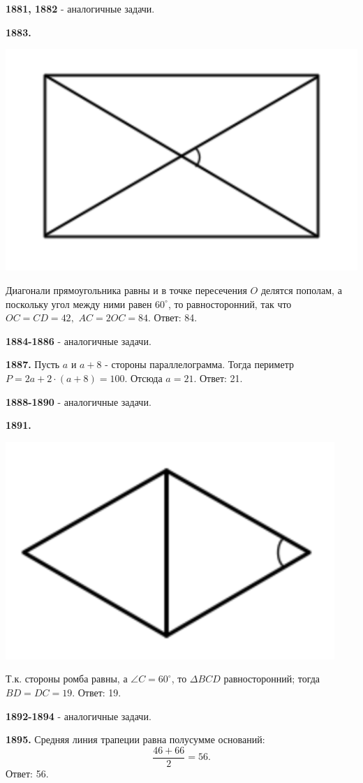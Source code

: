 \textbf{1881, 1882} - аналогичные задачи.

\textbf{1883.}

{\centering \includegraphics[width=0.5\linewidth]{Geometry/Content/23.png}
	
}

Диагонали прямоугольника равны и в точке пересечения $O$ делятся пополам, а поскольку угол между ними равен $60^\circ$, то   равносторонний, так что $OC = CD = 42,$ $AC= 2OC = 84$. \newline \null \hspace*{\fill} Ответ: 84.

\textbf{1884-1886} - аналогичные задачи.

\textbf{1887.} Пусть $a$ и $a+8$ - стороны параллелограмма. Тогда периметр $P = 2a + 2\cdot(a+8)=100.$
Отсюда $a = 21$. \newline \null \hspace*{\fill} Ответ: 21. 

\textbf{1888-1890} - аналогичные задачи.

\textbf{1891.}

{\centering \includegraphics[width=0.4\linewidth]{Geometry/Content/24.png}
	
}

Т.к. стороны ромба равны, а $\angle C = 60^\circ$, то $\Delta BCD$ равносторонний; тогда $BD = DC = 19$. \newline \null \hspace*{\fill} Ответ: 19.  

\textbf{1892-1894} - аналогичные задачи.

\textbf{1895.} Средняя линия трапеции равна полусумме оснований: 
\[\frac{46+66}{2} = 56.\] \null \hspace*{\fill} Ответ: 56.

